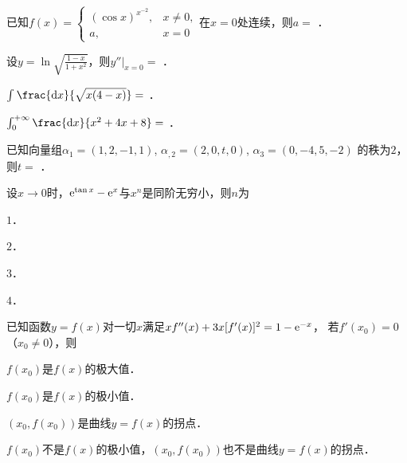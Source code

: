 \documentclass[plain,noanswer,medmath]{../../template/jnuexam}
\begin{document}






\begin{problem}
已知$f(x) = \begin{cases}
  (\cos x)^{x^{-2}}, & x \ne 0, \\
                  a, & x = 0
\end{cases}$在$x = 0$处连续，则$a =$ \fillin{}．
\end{problem}


\begin{problem}
设$y = \ln \sqrt{\frac{1 - x}{1 + x^2}}$，则$y''\big|_{x = 0} =$ \fillin{}．
\end{problem}


\begin{problem}
$\int_{}^{} \frac{\dx}{\sqrt{x(4 - x)}} =$ \fillin{}．
\end{problem}


\begin{problem}
$\int_0^{+\infty} \frac{\dx}{x^2 + 4x + 8} =$ \fillin{}．
\end{problem}


\begin{problem}
已知向量组$\alpha_1 = (1,2, - 1,1)$, $\alpha_{,2} = (2,0,t,0)$, $\alpha_3 = (0, - 4,5, - 2)$
的秩为$2$，则$t =$ \fillin{}．
\end{problem}




\begin{problem}
设$x \to 0$时，$\mathrm{e}^{\tan x} - \mathrm{e}^x$与$x^n$是同阶无穷小，则$n$为\pickout{}
\begin{abcd}
\item $1$．			
\item $2$．			
\item $3$．			
\item $4$．
\end{abcd}
\end{problem}




\begin{problem}
已知函数$y = f(x)$对一切$x$满足$xf''(x) + 3x[f'(x)]^2 = 1 - \mathrm{e}^{- x}$，
若$f'(x_0) = 0$（$x_0 \ne 0$），则\pickout{}
\begin{abcd}
\item $f(x_0)$是$f(x)$的极大值．
\item $f(x_0)$是$f(x)$的极小值．
\item $(x_0,f(x_0))$是曲线$y = f(x)$的拐点．
\item $f(x_0)$不是$f(x)$的极小值，$(x_0,f(x_0))$也不是曲线$y = f(x)$的拐点．
\end{abcd}
\end{problem}
\end{document}
